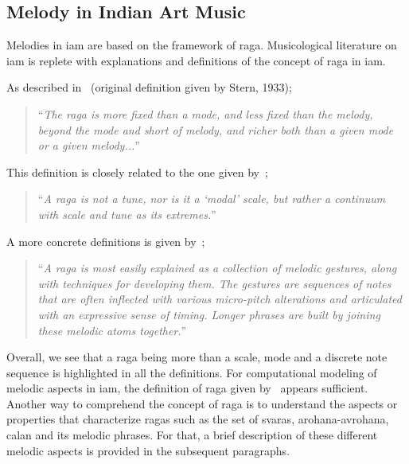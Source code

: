 

\subsection{Melody in Indian Art Music}

Melodies in \gls{iam} are based on the framework of \gls{raga}. Musicological literature on \gls{iam} is replete with explanations and definitions of the concept of \gls{raga} in \gls{iam}. 

As described in~\cite[p. 96]{martinez2001semiosis} (original definition given by Stern, 1933);

\blockquote{``\textit{The \gls{raga} is more fixed than a mode, and less fixed than the melody, beyond the mode and short of melody, and richer both than a given mode or a given melody...}''}

This definition is closely related to the one given by~\cite{powers1963background};

\blockquote{``\textit{A \gls{raga} is not a tune, nor is it a `modal' scale, but rather a continuum with scale and tune as its extremes.}''}

A more concrete definitions is given by~\cite{chordia2013joint};

\blockquote{``\textit{A \gls{raga} is most easily explained as a collection of melodic gestures, along with techniques for developing them. The gestures are sequences of notes that are often inflected with various micro-pitch alterations and articulated with an expressive sense of timing. Longer phrases are built by joining these melodic atoms together.}''}

Overall, we see that a \gls{raga} being more than a scale, mode and a discrete note sequence is highlighted in all the definitions. For computational modeling of melodic aspects in \gls{iam}, the definition of \gls{raga} given by~\cite{chordia2013joint} appears sufficient. Another way to comprehend the concept of \gls{raga} is to understand the aspects or properties that characterize \glspl{raga} such as the set of \glspl{svara}, \gls{arohana}-\gls{avrohana}, calan and its melodic phrases. For that, a brief description of these different melodic aspects is provided in the subsequent paragraphs.

